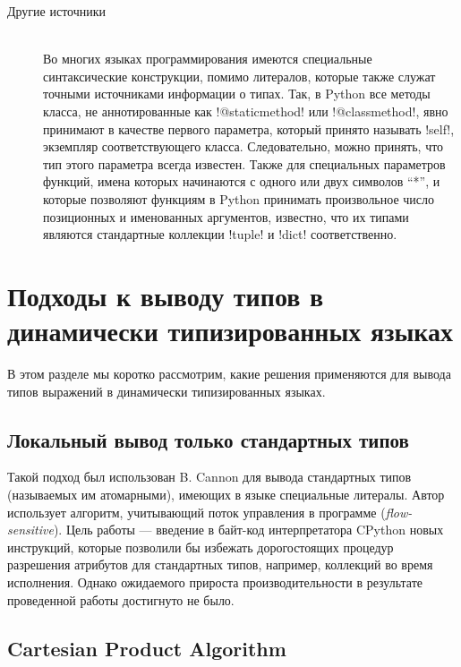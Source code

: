 \begin{description}
    \item[Другие источники] \hfill \\
        Во многих языках программирования имеются специальные синтаксические
        конструкции, помимо литералов, которые также служат точными источниками
        информации о типах. Так, в Python все методы класса, не аннотированные
        как !@staticmethod! или !@classmethod!, явно принимают в качестве первого
        параметра, который принято называть !self!, экземпляр соответствующего
        класса. Следовательно, можно принять, что тип этого параметра всегда
        известен.  Также для специальных параметров функций, имена которых
        начинаются с одного или двух символов ``*'', и которые позволяют функциям в
        Python принимать произвольное число позиционных и именованных аргументов,
        известно, что их типами являются стандартные коллекции !tuple! и !dict!
        соответственно.

\end{description}
     
\section{Подходы к выводу типов в динамически типизированных языках}

В этом разделе мы коротко рассмотрим, какие решения применяются для вывода
типов выражений в динамически типизированных языках.

\subsection{Локальный вывод только стандартных типов}

Такой подход был использован B. Cannon для вывода стандартных типов (называемых им
атомарными), имеющих в языке специальные литералы. Автор использует алгоритм,
учитывающий поток управления в программе (\emph{flow-sensitive}). Цель работы
--- введение в байт-код интерпретатора CPython новых инструкций, которые
позволили бы избежать дорогостоящих процедур разрешения атрибутов для
стандартных типов, например, коллекций во время исполнения. Однако ожидаемого
прироста производительности в результате проведенной работы достигнуто не было.

\subsection{Cartesian Product Algorithm}
\label{sub:cpa-algorithm}


